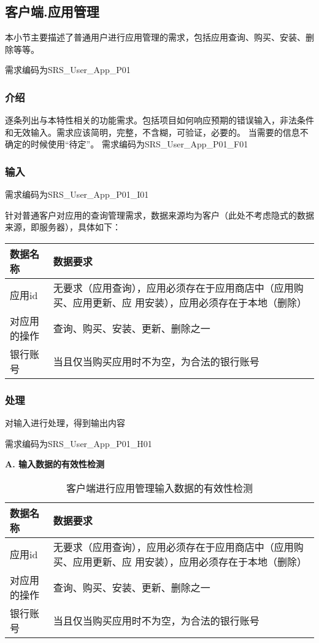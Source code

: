 \subsection{客户端.应用管理}
本小节主要描述了普通用户进行应用管理的需求，包括应用查询、购买、安装、删除等等。

需求编码为SRS\_User\_App\_P01
\subsubsection{介绍}
逐条列出与本特性相关的功能需求。包括项目如何响应预期的错误输入，非法条件和无效输入。需求应该简明，完整，不含糊，可验证，必要的。 当需要的信息不确定的时候使用“待定”。
需求编码为SRS\_User\_App\_P01\_F01

\subsubsection{输入}

需求编码为SRS\_User\_App\_P01\_I01

针对普通客户对应用的查询管理需求，数据来源均为客户（此处不考虑隐式的数据来源，即服务器），具体如下：

\begin{longtable}[]{@{}ll@{}}
\toprule
数据名称 & 数据要求\tabularnewline
\midrule
\endhead
应用id & 无要求（应用查询），应用必须存在于应用商店中（应用购买、应用更新、应             用安装），应用必须存在于本地（删除）\tabularnewline
对应用的操作 & 查询、购买、安装、更新、删除之一\tabularnewline
银行账号 & 当且仅当购买应用时不为空，为合法的银行账号\tabularnewline
\bottomrule
\end{longtable}

\subsubsection{处理}
对输入进行处理，得到输出内容

需求编码为SRS\_User\_App\_P01\_H01

\textbf{A. 输入数据的有效性检测}

\begin{longtable}[]{@{}ll@{}}
\caption{客户端进行应用管理输入数据的有效性检测}\label{tab:client_app_management}\\
\toprule
数据名称 & 数据要求\tabularnewline
\midrule
\endhead
应用id & 无要求（应用查询），应用必须存在于应用商店中（应用购买、应用更新、应             用安装），应用必须存在于本地（删除）\tabularnewline
对应用的操作 & 查询、购买、安装、更新、删除之一\tabularnewline
银行账号 & 当且仅当购买应用时不为空，为合法的银行账号\tabularnewline
\bottomrule
\end{longtable}

